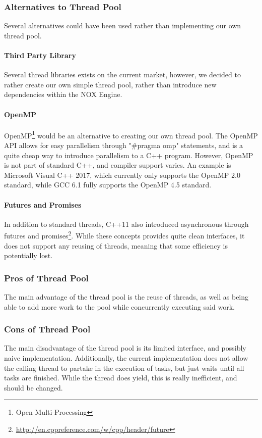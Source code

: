 \subsubsection{Alternatives to Thread Pool}
Several alternatives could have been used rather than implementing our own thread pool.

\paragraph{Third Party Library}
Several thread libraries exists on the current market, however, we decided to rather create our own simple thread pool,
rather than introduce new dependencies within the NOX Engine.

\paragraph{OpenMP}
OpenMP\footnote{Open Multi-Processing} would be an alternative to creating our own thread pool.
The OpenMP API allows for easy parallelism through "\#pragma omp" statements, and is a quite cheap way to introduce
parallelism to a C++ program. However, OpenMP is not part of standard C++, and compiler support varies.
An example is Microsoft Visual C++ 2017, which currently only supports the OpenMP 2.0 standard\cite{microsoft_openmp_support},
while GCC 6.1 fully supports the OpenMP 4.5 standard\cite{gcc_openmp_support}.

\paragraph{Futures and Promises}
In addition to standard threads, C++11 also introduced asynchronous through futures and promises\footnote{\url{http://en.cppreference.com/w/cpp/header/future}}.
While these concepts provides quite clean interfaces, it does not support any reusing of threads, meaning that some efficiency is potentially lost.

\subsubsection{Pros of Thread Pool}
The main advantage of the thread pool is the reuse of threads, as well as being able to add more work to the pool while concurrently executing said work.

\subsubsection{Cons of Thread Pool}
The main disadvantage of the thread pool is its limited interface, and possibly naive implementation.
Additionally, the current implementation does not allow the calling thread to partake in the execution of tasks,
but just waits until all tasks are finished.
While the thread does yield, this is really inefficient, and should be changed.
